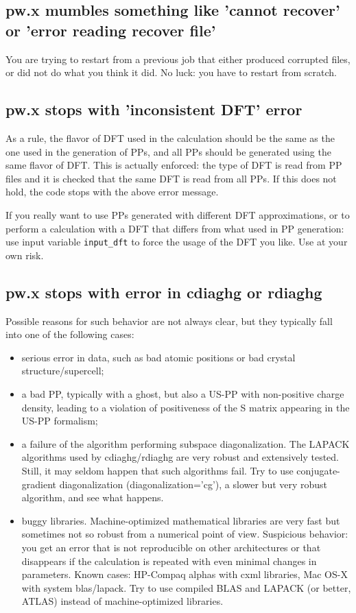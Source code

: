 \documentclass[12pt,a4paper]{article}
\begin{document}
\subsection{pw.x mumbles something like 'cannot recover' or 'error
  reading recover file'} 
You are trying to restart from a previous job that either
produced corrupted files, or did not do what you think it did. No luck: you
have to restart from scratch.

\subsection{pw.x stops with 'inconsistent DFT' error}
As a rule, the flavor of DFT used in the calculation should be the
same as the one used in the generation of PPs, and all PPs should be
generated using the same flavor of DFT. This is actually enforced: the
type of DFT is read from PP files and it is checked that the same DFT
is read from all PPs. If this does not hold, the code stops with the
above error message. 

If you really want to use PPs generated with different DFT approximations, 
or to perform a calculation with a DFT that differs from what used in PP 
generation: use input variable \texttt{input\_dft} to force the usage of 
the DFT you like. Use at your own risk.

\subsection{pw.x stops with error in cdiaghg or rdiaghg}
Possible reasons for such behavior are not always clear, but they
typically fall into one of the following cases:
\begin{itemize}
\item serious error in data, such as bad atomic positions or bad
  crystal structure/supercell; 
\item a bad PP, typically with a ghost, but also a US-PP with
  non-positive charge density, leading to a violation of positiveness
  of the S matrix appearing in the US-PP formalism;  
\item a failure of the algorithm performing subspace
  diagonalization. The LAPACK algorithms used by cdiaghg/rdiaghg are
  very robust and extensively tested. Still, it may seldom happen that
  such algorithms fail. Try to use conjugate-gradient diagonalization
  (diagonalization='cg'), a slower but very robust algorithm, and see
  what happens. 
\item buggy libraries. Machine-optimized mathematical libraries are
  very fast but sometimes not so robust from a numerical point of
  view.  Suspicious behavior: you get an error that is not
  reproducible on other architectures or that disappears if the
  calculation is repeated with even minimal changes in
  parameters. Known cases: HP-Compaq alphas with cxml libraries, Mac
  OS-X with system blas/lapack. Try to use compiled BLAS and LAPACK
  (or better, ATLAS) instead of machine-optimized libraries. 
\end{itemize}
\end{document}
